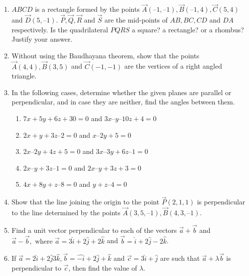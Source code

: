 \begin{enumerate}[label=\thesubsection.\arabic*, ref=\thesubsection.\theenumi]
	\solution
		
\item $ABCD$ is a rectangle formed by the points $\vec{A}(–1,  –1),  \vec{B}(– 1,  4),  \vec{C}(5,  4)$  and  $\vec{D}(5,  – 1)$. $\vec{P},  \vec{Q},  \vec{R}$ and $\vec{S}$ are the mid-points of $AB,  BC,  CD$ and $DA$ respectively. Is the quadrilateral $PQRS$ a square? a rectangle? or a rhombus? Justify your answer.
	\\
	
\item Without using the Baudhayana theorem,  show that the points $\vec{A}(4, 4),  \vec{B}(3, 5)$ and $\vec{C}(-1, -1)$ are the vertices of a right angled triangle.
\label{chapters/11/10/1/6}
\\
\solution

\item In the following cases,  determine whether the given planes are parallel or perpendicular,  and in case they are neither,  find the angles between them.
\begin{enumerate}
\item $7x + 5y + 6z + 30 = 0$ and $3x – y – 10z + 4 = 0$
\item $2x + y + 3z – 2 = 0$ and $x – 2y + 5 = 0$
\item $2x – 2y + 4z + 5 = 0$ and $3x – 3y + 6z – 1 = 0$
\item $2x – y + 3z – 1 = 0$ and $2x – y + 3z + 3 = 0$
\item $4x + 8y + z – 8 = 0$ and $y + z – 4 = 0$
\end{enumerate}
    \solution
		
		\item 
 Show that the line joining the origin to the point $\vec{P}(2,  1,  1)$ is perpendicular to the
line determined by the points $\vec{A}(3,  5,  – 1),  \vec{B}(4,  3,  – 1)$.
\\
    \solution
		
\item Find a unit vector perpendicular to each of the vectors $\overrightarrow{a}+\overrightarrow{b}$ and $\overrightarrow{a}-\overrightarrow{b}, \text{ where } \overrightarrow{a}=3\hat{i}+2\hat{j}+2\hat{k}$ and $ \overrightarrow{b}=\hat{i}+2\hat{j}-2\hat{k}$. 
	\\
		\solution
		
\item If $\overrightarrow {a}=2\hat{i}+2\hat{j}3\hat{k}, \overrightarrow {b}=\hat{-i}+2\hat{j}+\hat{k}$ and $\overrightarrow {c}=3\hat{i}+\hat{j}$ are such that $\overrightarrow {a}+\lambda\overrightarrow {b}$ is perpendicular to $\overrightarrow {c}$, then find the value of $\lambda$.

\end{enumerate}
